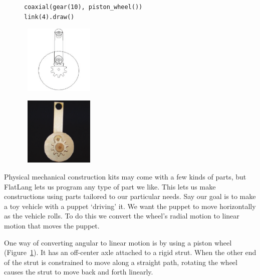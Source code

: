 \documentclass[times, 10pt,twocolumn]{article}
\makeatletter
\newenvironment{subfloat}%
{\def\caption##1{\gdef\subcapsave{\relax##1}}%
\let\subcapsave=\@empty %
\let\sf@oldlabel=\label 
\def\label##1{\xdef\sublabsave{\noexpand\label{##1}}}%
\let\sublabsave\relax %
\setbox\subfigbox\hbox 
\bgroup}%
{\egroup %
\let\label=\sf@oldlabel 
\subfigure[\subcapsave]{\box\subfigbox}}%
\makeatother
\begin{document}
\begin{figure}[h]
\centering
  \begin{subfloat}
    \begin{minipage}{2.6in} 
      \footnotesize
\begin{verbatim}
coaxial(gear(10), piston_wheel())
link(4).draw()
\end{verbatim}
    \end{minipage}%
  \end{subfloat} 
  \begin{minipage}{1.3in}
      \centering 
    \begin{subfloat}
      \includegraphics[width=1.3in]{mechanism-graphics-correct.pdf}
    \end{subfloat}
  \end{minipage}
  \begin{minipage}{1.3in}
      \centering 
    \begin{subfloat}
      \includegraphics[width=1.3in]{mechanism-physical-correct.pdf}
    \end{subfloat}
  \end{minipage}
  \caption{High-level \nohyphens{FlatLang} code, graphics, and
    physical output for a simple mechanism.}
  \label{fig:machine-code} 
\end{figure} 

Physical mechanical construction kits may come with a few kinds of
parts, but FlatLang lets us program any type of part we like. This
lets us make constructions using parts tailored to our particular
needs. Say our goal is to make a toy vehicle with a puppet `driving'
it. We want the puppet to move horizontally as the vehicle rolls. To
do this we convert the wheel's radial motion to linear motion that
moves the puppet.

One way of converting angular to linear motion is by using a piston
wheel (Figure~\ref{fig:machine-code}). It has an off-center axle
attached to a rigid strut. When the other end of the strut is
constrained to move along a straight path, rotating the wheel causes
the strut to move back and forth linearly.
\end{document}
